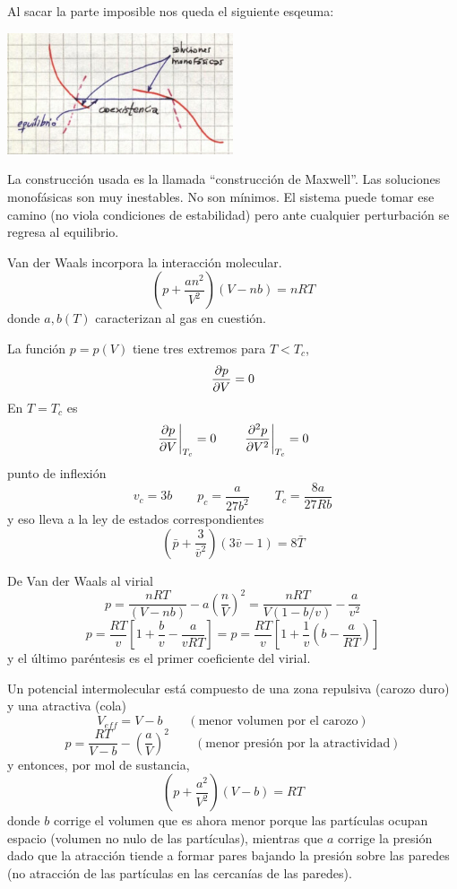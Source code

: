 \documentclass[10pt,oneside]{CBFT_book}
\begin{document}
Al sacar la parte imposible nos queda el siguiente esqeuma:

\includegraphics[width=0.50\textwidth]{images/1606329069.jpg}

La construcción usada es la llamada ``construcción de Maxwell''. Las soluciones monofásicas son muy
inestables.
No son mínimos. El sistema puede tomar ese camino (no viola condiciones de estabilidad) pero ante
cualquier perturbación se regresa al equilibrio.


Van der Waals incorpora la interacción molecular. 
\[
	\left( p +\frac{an^2}{V^2} \right)(V- nb) = nRT
\]
donde $a,b(T)$ caracterizan al gas en cuestión.

La función $p=p(V)$ tiene tres extremos para $T<T_c$,
\[
	\dpar{p}{V} = 0
\]
En $T=T_c$ es
\[
	\left.\dpar{p}{V} \right|_{T_c} = 0 \qquad \left.\dpar[2]{p}{V} \right|_{T_c} = 0
\]
punto de inflexión
\[
	v_c = 3b \qquad p_c = \frac{a}{27b^2} \qquad T_c = \frac{8a}{27Rb}
\]
y eso lleva a la ley de estados correspondientes
\[
	\left( \bar{p} + \frac{3}{\bar{v}^2} \right)(3 \bar{v} - 1)= 8\bar{T}
\]

De Van der Waals al virial
\[
	p = \frac{nRT}{(V-nb)} - a \left(\frac{n}{V} \right)^2 = 
	\frac{nRT}{V(1-b/v)}- \frac{a}{v^2}
\]
\[
	p = \frac{RT}{v}\left[ 1 + \frac{b}{v} - \frac{a}{vRT} \right] =
	p = \frac{RT}{v}\left[ 1 + \frac{1}{v}\left( b - \frac{a}{RT} \right) \right]
\]
y el último paréntesis es el primer coeficiente del virial.

Un potencial intermolecular está compuesto de una zona repulsiva (carozo duro) y una atractiva (cola)
\[
	V_{eff} = V-b \qquad (\text{menor volumen por el carozo})
\]
\[
	p = \frac{RT}{V-b} - \left(\frac{a}{V}\right)^2 \qquad (\text{menor presión por la atractividad})
\]
y entonces, por mol de sustancia,
\[
	\left( p +\frac{a^2}{V^2} \right)(V- b)= RT
\]
donde $b$ corrige el volumen que es ahora menor porque las partículas ocupan espacio
(volumen no nulo de las partículas), mientras que $a$ corrige la presión dado que la
atracción tiende a formar pares bajando la presión sobre las paredes (no atracción de
las partículas en las cercanías de las paredes).
\end{document}
